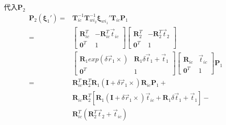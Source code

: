 \documentclass{article}
\begin{document}
代入$\boldsymbol{P}_2$
\begin{equation}
	\begin{aligned}
		\boldsymbol{P}_2(\boldsymbol{\xi}_1')          = & \boldsymbol{T}_{ic}^{-1}\boldsymbol{T}_{wi_2}^{-1}\boldsymbol{\xi}_{wi_1}'\boldsymbol{T}_{ic}\boldsymbol{P}_1 \\=&
		\left[
		\begin{matrix}
		\boldsymbol{R}_{ic}^T                       & -\boldsymbol{R}_{ic}^T\vec{t}_{ic}                                                                           \\
		\boldsymbol{0}^T                            & 1                                                                                                            
		\end{matrix}
		\right]
		\left[
		\begin{matrix}
		\boldsymbol{R}_2^T                          & -\boldsymbol{R}_2^T\vec{t}_2                                                                                 \\
		\boldsymbol{0}^T                            & 1                                                                                                            
		\end{matrix}
		\right] \\ &
		\left[
		\begin{matrix}
		\boldsymbol{R}_1exp(\delta \vec{r}_1\times) & \boldsymbol{R}_1\delta \vec{t}_1+\vec{t}_1                                                                   \\ 
		\boldsymbol{0}^T                            & 1                                                                                                            
		\end{matrix}
		\right]
		\left[
		\begin{matrix}
		\boldsymbol{R}_{ic}                         & \vec{t}_{ic}                                                                                                 \\
		\boldsymbol{0}^T                            & 1                                                                                                            
		\end{matrix}
		\right]\boldsymbol{P}_1 \\= &
		\boldsymbol{R}_{ic}^T\boldsymbol{R}_2^{T}\boldsymbol{R}_1(\boldsymbol{I}+\delta\vec{r}_1\times)\boldsymbol{R}_{ic}\boldsymbol{P}_1+ \\& 
		\boldsymbol{R}_{ic}\boldsymbol{R}_2^T[\boldsymbol{R}_1(\boldsymbol{I}+\delta\vec{r}_1\times)\vec{t}_{ic}+\boldsymbol{R}_1\delta\vec{t}_1+\vec{t}_1]-\\ &
		\boldsymbol{R}_{ic}^T(\boldsymbol{R}_2^T\vec{t}_2+\vec{t}_{ic})
	\end{aligned}
\end{equation}
\end{document}
